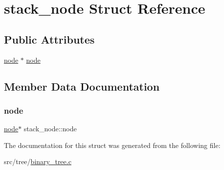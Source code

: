 \hypertarget{structstack__node}{}\section{stack\+\_\+node Struct Reference}
\label{structstack__node}
\subsection*{Public Attributes}
\begin{DoxyCompactItemize}
\item 
\mbox{\hyperlink{structnode}{node}} $\ast$ \mbox{\hyperlink{structstack__node_a0007d25a76e57b9f099ba6839cab2235}{node}}
\end{DoxyCompactItemize}


\subsection{Member Data Documentation}
\mbox{\label{structstack__node_a0007d25a76e57b9f099ba6839cab2235}} 
\subsubsection{\texorpdfstring{node}{node}}
{\footnotesize\ttfamily \mbox{\hyperlink{structnode}{node}}$\ast$ stack\+\_\+node\+::node}



The documentation for this struct was generated from the following file\+:\begin{DoxyCompactItemize}
\item 
src/tree/\mbox{\hyperlink{binary__tree_8c}{binary\+\_\+tree.\+c}}\end{DoxyCompactItemize}
